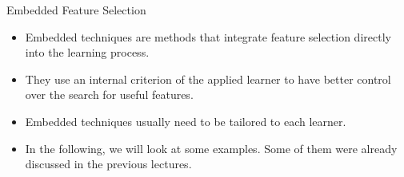 \documentclass[11pt,compress,t,notes=noshow, xcolor=table]{beamer}
\begin{document}

  \begin{vbframe}{Embedded Feature Selection}

    \begin{itemize}
      \item Embedded techniques are methods that integrate feature selection directly into the learning process.
      \item They use an internal criterion of the applied learner to have better control over the search for useful features.
      \item Embedded techniques usually need to be tailored to each learner.
      \item In the following, we will look at some examples.
      Some of them were already discussed in the previous lectures.
    \end{itemize}
      
  \end{vbframe}
\end{document}
